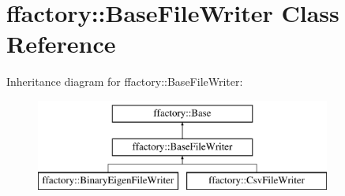 \hypertarget{classffactory_1_1_base_file_writer}{\section{ffactory\-:\-:Base\-File\-Writer Class Reference}
\label{classffactory_1_1_base_file_writer}
}
Inheritance diagram for ffactory\-:\-:Base\-File\-Writer\-:\begin{figure}[H]
\begin{center}
\leavevmode
\includegraphics[height=3.000000cm]{classffactory_1_1_base_file_writer}
\end{center}
\end{figure}
